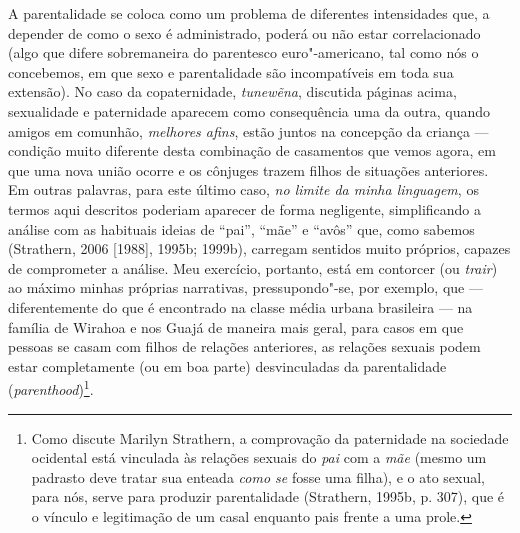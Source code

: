 A parentalidade se coloca como um problema de diferentes intensidades
que, a depender de como o sexo é administrado, poderá ou não estar
correlacionado (algo que difere sobremaneira do parentesco
euro"-americano, tal como nós o concebemos, em que sexo e parentalidade
são incompatíveis em toda sua extensão). No caso da copaternidade,
\emph{tunewẽna}, discutida páginas acima, sexualidade e paternidade
aparecem como consequência uma da outra, quando amigos em comunhão,
\emph{melhores afins}, estão juntos na concepção da criança --- condição
muito diferente desta combinação de casamentos que vemos agora, em que
uma nova união ocorre e os cônjuges trazem filhos de situações
anteriores. Em outras palavras, para este último caso, \emph{no limite
da minha linguagem}, os termos aqui descritos poderiam aparecer de forma
negligente, simplificando a análise com as habituais ideias de ``pai'',
``mãe'' e ``avôs'' que, como sabemos (Strathern, 2006 {[}1988{]}, 1995b;
1999b), carregam sentidos muito próprios, capazes de comprometer a
análise. Meu exercício, portanto, está em contorcer (ou \emph{trair}) ao
máximo minhas próprias narrativas, pressupondo"-se, por exemplo, que ---
diferentemente do que é encontrado na classe média urbana brasileira ---
na família de Wirahoa e nos Guajá de maneira mais geral, para casos em
que pessoas se casam com filhos de relações anteriores, as relações
sexuais podem estar completamente (ou em boa parte) desvinculadas da
parentalidade (\emph{parenthood})\footnote{Como discute Marilyn
  Strathern, a comprovação da paternidade na sociedade ocidental está
  vinculada às relações sexuais do \emph{pai} com a \emph{mãe} (mesmo um
  padrasto deve tratar sua enteada \emph{como se} fosse uma filha), e o
  ato sexual, para nós, serve para produzir parentalidade (Strathern,
  1995b, p. 307), que é o vínculo e legitimação de um casal enquanto pais
  frente a uma prole.}.

